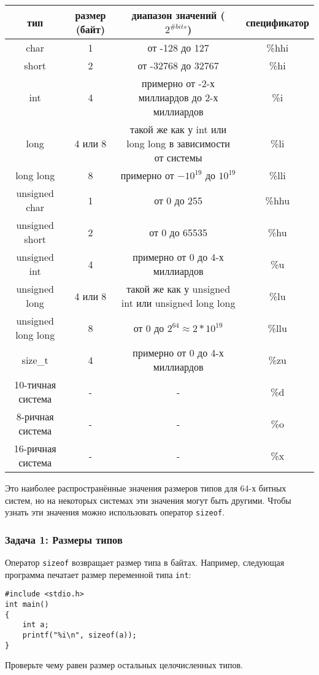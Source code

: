 \documentclass{article}
\begin{document}
\begin{center}
\begin{tabular}{ c c c c }
 тип & размер (байт) & диапазон значений ($2^{\# bits}$) & спецификатор \\ \hline
 char & 1 & от -128 до 127 & \%hhi \\ 
 short & 2 & от -32768 до 32767 & \%hi  \\  
 int & 4 & примерно от -2-х миллиардов до 2-х миллиардов & \%i  \\  
 long & 4 или 8 & такой же как у int или long long в зависимости от системы & \%li  \\  
 long long & 8 & примерно от $-10^{19}$ до $10^{19}$ & \%lli  \\  
 unsigned char & 1 & от 0 до 255 & \%hhu \\ 
 unsigned short & 2 & от 0 до 65535 & \%hu  \\  
 unsigned int & 4 & примерно от 0 до 4-х миллиардов & \%u  \\  
 unsigned long & 4 или 8 & такой же как у unsigned int или unsigned long long & \%lu  \\  
 unsigned long long & 8 & от 0 до $2^{64} \approx 2*10^{19}$  & \%llu  \\  
 size\_t & 4 & примерно от 0 до 4-х миллиардов & \%zu \\ \hline
 10-тичная система & - & - & \%d \\
 8-ричная система & - & - & \%o \\
 16-ричная система & - & - & \%x  \\ 
\end{tabular}
\end{center}
Это наиболее распространённые значения размеров типов для 64-х битных систем, но на некоторых системах эти значения могут быть другими.
Чтобы узнать эти значения можно использовать оператор \texttt{sizeof}. \\

\subsubsection*{Задача 1: Размеры типов}
Оператор \texttt{sizeof} возвращает размер типа в байтах. Например, следующая программа печатает размер переменной типа \texttt{int}:
\begin{lstlisting}
#include <stdio.h>
int main() 
{
    int a;
    printf("%i\n", sizeof(a));
}
\end{lstlisting}
Проверьте чему равен размер остальных целочисленных типов.
\end{document}
